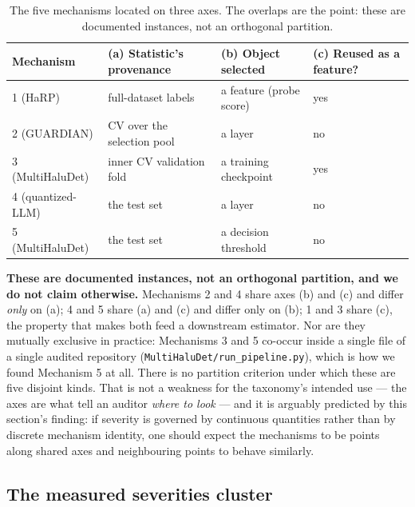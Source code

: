 \documentclass[10pt]{article} %
\begin{document}
\begin{table}[h]
\centering
\small
\begin{tabular}{llll}
\toprule
Mechanism & (a) Statistic's provenance & (b) Object selected & (c) Reused as a feature? \\
\midrule
1 (HaRP) & full-dataset labels & a feature (probe score) & yes \\
2 (GUARDIAN) & CV over the selection pool & a layer & no \\
3 (MultiHaluDet) & inner CV validation fold & a training checkpoint & yes \\
4 (quantized-LLM) & the test set & a layer & no \\
5 (MultiHaluDet) & the test set & a decision threshold & no \\
\bottomrule
\end{tabular}
\caption{The five mechanisms located on three axes. The overlaps are the
point: these are documented instances, not an orthogonal partition.}
\end{table}

\textbf{These are documented instances, not an orthogonal partition, and we do
not claim otherwise.} Mechanisms 2 and 4 share axes (b) and (c) and differ
\emph{only} on (a); 4 and 5 share (a) and (c) and differ only on (b); 1 and 3
share (c), the property that makes both feed a downstream estimator. Nor are
they mutually exclusive in practice: Mechanisms 3 and 5 co-occur inside a
single file of a single audited repository
(\texttt{MultiHaluDet/run\_pipeline.py}), which is how we found Mechanism 5 at
all. There is no partition criterion under which these are five disjoint kinds.
That is not a weakness for the taxonomy's intended use --- the axes are what
tell an auditor \emph{where to look} --- and it is arguably predicted by this
section's finding: if severity is governed by continuous quantities rather than
by discrete mechanism identity, one should expect the mechanisms to be points
along shared axes and neighbouring points to behave similarly.

\subsection{The measured severities cluster}
\end{document}
